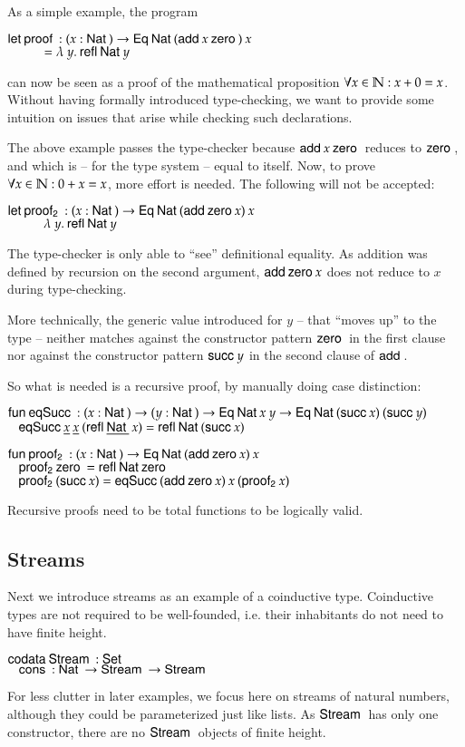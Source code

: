 \noindent As a simple example, the program
\begin{bsp}
$ \mathsf{let}\: \mathsf{proof}\: : ( x : \mathsf{Nat}\: ) \rightarrow{\mathsf{Eq}\:\mathsf{Nat}\:(\mathsf{add}\:x \: \mathsf{zero}\:)\: x} $ \\ 
$ \spcx = \lam{y}\refl \Nat y$ 
\end{bsp}
can now be seen as a proof of the mathematical proposition $ \forall x \in \mathbb{N} : x  + 0 = x $. Without having formally introduced type-checking, we want to provide some intuition on issues that arise while checking such declarations.

The above example passes the type-checker because $\mathsf{add}\: x \: \mathsf{zero}\:$ reduces to $\mathsf{zero}\:$, and which is -- for the type system -- equal to itself. 
Now, to prove $ \forall x \in \mathbb{N} : 0 +  x = x $, more effort is needed.
The following will not be accepted:
\begin{bsp}
$ \mathsf{let}\: \mathsf{proof_2}\: : ( x : \mathsf{Nat}\: ) \rightarrow{\mathsf{Eq}\:\mathsf{Nat}\:(\mathsf{add}\:\mathsf{zero}\:x) \: x} $ \\ 
$ \spcx \lam{y} \refl \Nat y$ 
\end{bsp}
The type-checker is only able to ``see'' definitional equality.
As addition was defined by recursion on the second argument, $\mathsf{add}\: \mathsf{zero}\: x$ does not reduce to $x$ during type-checking.

More technically, the generic value introduced for $y$ -- that ``moves up'' to the type -- neither matches against the constructor pattern $\mathsf{zero}\:$ in the first clause
nor against the constructor pattern $\mathsf{succ}\: y$ in the second clause of $\mathsf{add}\:$.

So what is needed is a recursive proof, by manually doing case distinction:
\begin{bsp}
$\mathsf{fun}\: \mathsf{eqSucc}\: : ( x : \mathsf{Nat}\: ) \rightarrow( y : \mathsf{Nat}\: ) \rightarrow \mathsf{Eq}\: \mathsf{Nat}\: x \: y \rightarrow \mathsf{Eq}\: \mathsf{Nat}\: (\mathsf{succ}\: x) \: (\mathsf{succ}\: y)$ \\
$\hspace*{3mm} \mathsf{eqSucc}\: \underline{x} \: \underline{x} \: (\mathsf{refl}\: \underline{\mathsf{Nat}\:} \: x) = \mathsf{refl}\: \mathsf{Nat}\: (\mathsf{succ}\: x)$

$\mathsf{fun}\: \mathsf{proof_2}\: : ( x : \mathsf{Nat}\: ) \rightarrow \mathsf{Eq}\: \mathsf{Nat}\: (\mathsf{add}\: \mathsf{zero}\: x) \: x$\\
$\hspace*{3mm} \mathsf{proof_2}\: \mathsf{zero}\: = \mathsf{refl}\: \mathsf{Nat}\: \mathsf{zero}\:$\\
$\hspace*{3mm} \mathsf{proof_2}\: (\mathsf{succ}\: x) = \mathsf{eqSucc}\: (\mathsf{add}\: \mathsf{zero}\: x)\: x \: (\mathsf{proof_2}\: x)$
\end{bsp}
Recursive proofs need to be total functions to be logically valid.

\subsection{Streams}
\label{lstream}
Next we introduce streams as an example of a coinductive type.
Coinductive types are not required to be well-founded, i.e. their inhabitants do not need to have finite height.
\begin{bsp}
$\mathsf{codata}\: \mathsf{Stream}\: : \mathsf{Set} $ \\
$\hspace*{3mm} \mathsf{cons}\: : \mathsf{Nat}\: \rightarrow \mathsf{Stream}\: \rightarrow \mathsf{Stream}\: $
\end{bsp}
For less clutter in later examples, we focus here on streams of natural numbers, although they could be parameterized just like lists.
As $\mathsf{Stream}\:$ has only one constructor, there are no $\mathsf{Stream}\:$ objects of finite height.

